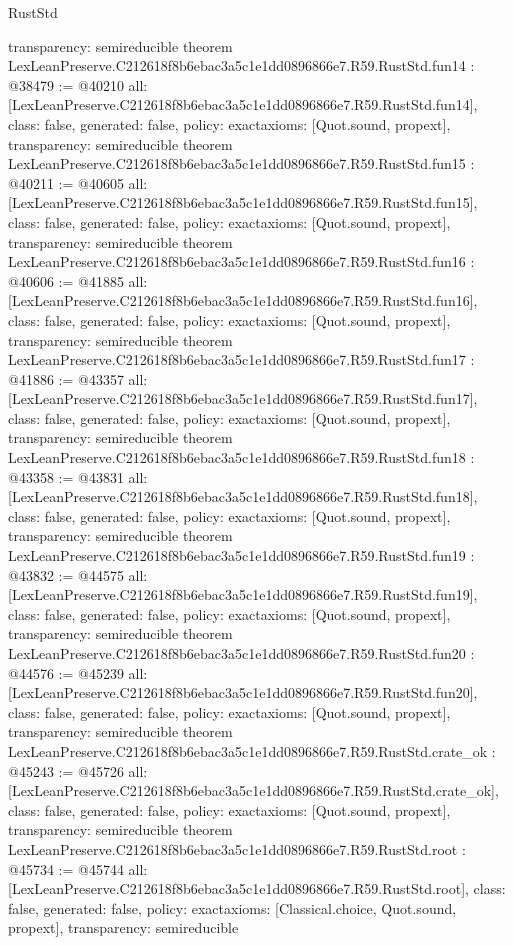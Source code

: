 \begin{lexlean}{RustStd}
\begin{coremodule}
{  transparency: semireducible
}
theorem LexLeanPreserve.C212618f8b6ebac3a5c1e1dd0896866e7.R59.RustStd.fun14 : @38479 := @40210 {
  all: [LexLeanPreserve.C212618f8b6ebac3a5c1e1dd0896866e7.R59.RustStd.fun14],
  class: false,
  generated: false,
  policy: exact{axioms: [Quot.sound, propext]},
  transparency: semireducible
}
theorem LexLeanPreserve.C212618f8b6ebac3a5c1e1dd0896866e7.R59.RustStd.fun15 : @40211 := @40605 {
  all: [LexLeanPreserve.C212618f8b6ebac3a5c1e1dd0896866e7.R59.RustStd.fun15],
  class: false,
  generated: false,
  policy: exact{axioms: [Quot.sound, propext]},
  transparency: semireducible
}
theorem LexLeanPreserve.C212618f8b6ebac3a5c1e1dd0896866e7.R59.RustStd.fun16 : @40606 := @41885 {
  all: [LexLeanPreserve.C212618f8b6ebac3a5c1e1dd0896866e7.R59.RustStd.fun16],
  class: false,
  generated: false,
  policy: exact{axioms: [Quot.sound, propext]},
  transparency: semireducible
}
theorem LexLeanPreserve.C212618f8b6ebac3a5c1e1dd0896866e7.R59.RustStd.fun17 : @41886 := @43357 {
  all: [LexLeanPreserve.C212618f8b6ebac3a5c1e1dd0896866e7.R59.RustStd.fun17],
  class: false,
  generated: false,
  policy: exact{axioms: [Quot.sound, propext]},
  transparency: semireducible
}
theorem LexLeanPreserve.C212618f8b6ebac3a5c1e1dd0896866e7.R59.RustStd.fun18 : @43358 := @43831 {
  all: [LexLeanPreserve.C212618f8b6ebac3a5c1e1dd0896866e7.R59.RustStd.fun18],
  class: false,
  generated: false,
  policy: exact{axioms: [Quot.sound, propext]},
  transparency: semireducible
}
theorem LexLeanPreserve.C212618f8b6ebac3a5c1e1dd0896866e7.R59.RustStd.fun19 : @43832 := @44575 {
  all: [LexLeanPreserve.C212618f8b6ebac3a5c1e1dd0896866e7.R59.RustStd.fun19],
  class: false,
  generated: false,
  policy: exact{axioms: [Quot.sound, propext]},
  transparency: semireducible
}
theorem LexLeanPreserve.C212618f8b6ebac3a5c1e1dd0896866e7.R59.RustStd.fun20 : @44576 := @45239 {
  all: [LexLeanPreserve.C212618f8b6ebac3a5c1e1dd0896866e7.R59.RustStd.fun20],
  class: false,
  generated: false,
  policy: exact{axioms: [Quot.sound, propext]},
  transparency: semireducible
}
theorem LexLeanPreserve.C212618f8b6ebac3a5c1e1dd0896866e7.R59.RustStd.crate_ok : @45243 := @45726 {
  all: [LexLeanPreserve.C212618f8b6ebac3a5c1e1dd0896866e7.R59.RustStd.crate_ok],
  class: false,
  generated: false,
  policy: exact{axioms: [Quot.sound, propext]},
  transparency: semireducible
}
theorem LexLeanPreserve.C212618f8b6ebac3a5c1e1dd0896866e7.R59.RustStd.root : @45734 := @45744 {
  all: [LexLeanPreserve.C212618f8b6ebac3a5c1e1dd0896866e7.R59.RustStd.root],
  class: false,
  generated: false,
  policy: exact{axioms: [Classical.choice, Quot.sound, propext]},
  transparency: semireducible
}


\end{coremodule}
\end{lexlean}
